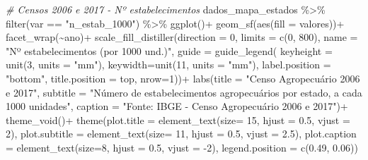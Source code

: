\documentclass[
  brazilian,
]{book}
\newenvironment{Shaded}{\begin{snugshade}}{\end{snugshade}}
\newcommand{\AttributeTok}[1]{\textcolor[rgb]{0.77,0.63,0.00}{#1}}
\newcommand{\CommentTok}[1]{\textcolor[rgb]{0.56,0.35,0.01}{\textit{#1}}}
\newcommand{\DecValTok}[1]{\textcolor[rgb]{0.00,0.00,0.81}{#1}}
\newcommand{\FloatTok}[1]{\textcolor[rgb]{0.00,0.00,0.81}{#1}}
\newcommand{\FunctionTok}[1]{\textcolor[rgb]{0.00,0.00,0.00}{#1}}
\newcommand{\NormalTok}[1]{#1}
\newcommand{\SpecialCharTok}[1]{\textcolor[rgb]{0.00,0.00,0.00}{#1}}
\newcommand{\StringTok}[1]{\textcolor[rgb]{0.31,0.60,0.02}{#1}}
\begin{document}
\begin{Shaded}
\begin{Highlighting}[]
\CommentTok{\# Censos 2006 e 2017 {-} Nº estabelecimentos}
\NormalTok{dados\_mapa\_estados }\SpecialCharTok{\%\textgreater{}\%} 
  \FunctionTok{filter}\NormalTok{(var }\SpecialCharTok{==} \StringTok{"n\_estab\_1000"}\NormalTok{) }\SpecialCharTok{\%\textgreater{}\%}
  \FunctionTok{ggplot}\NormalTok{()}\SpecialCharTok{+}
  \FunctionTok{geom\_sf}\NormalTok{(}\FunctionTok{aes}\NormalTok{(}\AttributeTok{fill =}\NormalTok{ valores))}\SpecialCharTok{+}
  \FunctionTok{facet\_wrap}\NormalTok{(}\SpecialCharTok{\textasciitilde{}}\NormalTok{ano)}\SpecialCharTok{+}
  \FunctionTok{scale\_fill\_distiller}\NormalTok{(}\AttributeTok{direction =} \DecValTok{0}\NormalTok{,}
                       \AttributeTok{limits =} \FunctionTok{c}\NormalTok{(}\DecValTok{0}\NormalTok{, }\DecValTok{800}\NormalTok{),}
                       \AttributeTok{name =} \StringTok{"Nº estabelecimentos (por 1000 und.)"}\NormalTok{,}
                       \AttributeTok{guide =} \FunctionTok{guide\_legend}\NormalTok{(}
                         \AttributeTok{keyheight =} \FunctionTok{unit}\NormalTok{(}\DecValTok{3}\NormalTok{, }\AttributeTok{units =} \StringTok{"mm"}\NormalTok{),}
                         \AttributeTok{keywidth=}\FunctionTok{unit}\NormalTok{(}\DecValTok{11}\NormalTok{, }\AttributeTok{units =} \StringTok{"mm"}\NormalTok{),}
                         \AttributeTok{label.position =} \StringTok{"bottom"}\NormalTok{,}
                         \AttributeTok{title.position =} \StringTok{\textquotesingle{}top\textquotesingle{}}\NormalTok{, }\AttributeTok{nrow=}\DecValTok{1}\NormalTok{))}\SpecialCharTok{+}
  \FunctionTok{labs}\NormalTok{(}\AttributeTok{title =} \StringTok{"Censo Agropecuário 2006 e 2017"}\NormalTok{,}
       \AttributeTok{subtitle =} \StringTok{"Número de estabelecimentos agropecuários por estado, a cada 1000 unidades"}\NormalTok{,}
       \AttributeTok{caption =} \StringTok{"Fonte: IBGE {-} Censo Agropecuário 2006 e 2017"}\NormalTok{)}\SpecialCharTok{+}
  \FunctionTok{theme\_void}\NormalTok{()}\SpecialCharTok{+}
  \FunctionTok{theme}\NormalTok{(}\AttributeTok{plot.title =} \FunctionTok{element\_text}\NormalTok{(}\AttributeTok{size=} \DecValTok{15}\NormalTok{, }\AttributeTok{hjust =} \FloatTok{0.5}\NormalTok{, }\AttributeTok{vjust =} \DecValTok{2}\NormalTok{),}
        \AttributeTok{plot.subtitle =} \FunctionTok{element\_text}\NormalTok{(}\AttributeTok{size=} \DecValTok{11}\NormalTok{, }\AttributeTok{hjust =} \FloatTok{0.5}\NormalTok{, }\AttributeTok{vjust =} \FloatTok{2.5}\NormalTok{),}
        \AttributeTok{plot.caption =} \FunctionTok{element\_text}\NormalTok{(}\AttributeTok{size=}\DecValTok{8}\NormalTok{, }\AttributeTok{hjust =} \FloatTok{0.5}\NormalTok{, }\AttributeTok{vjust =} \SpecialCharTok{{-}}\DecValTok{2}\NormalTok{),}
        \AttributeTok{legend.position =} \FunctionTok{c}\NormalTok{(}\FloatTok{0.49}\NormalTok{, }\FloatTok{0.06}\NormalTok{))}
\end{Highlighting}
\end{Shaded}
\end{document}
